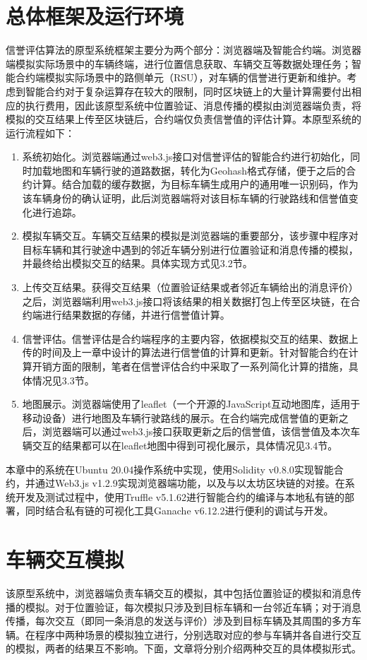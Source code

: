 \section{总体框架及运行环境}
信誉评估算法的原型系统框架主要分为两个部分：浏览器端及智能合约端。浏览器端模拟实际场景中的车辆终端，进行位置信息获取、车辆交互等数据处理任务；智能合约端模拟实际场景中的路侧单元（RSU），对车辆的信誉进行更新和维护。考虑到智能合约对于复杂运算存在较大的限制，同时区块链上的大量计算需要付出相应的执行费用，因此该原型系统中位置验证、消息传播的模拟由浏览器端负责，将模拟的交互结果上传至区块链后，合约端仅负责信誉值的评估计算。本原型系统的运行流程如下：
\begin{enumerate}
    \item 系统初始化。浏览器端通过web3.js接口对信誉评估的智能合约进行初始化，同时加载地图和车辆行驶的道路数据，转化为Geohash格式存储，便于之后的合约计算。结合加载的缓存数据，为目标车辆生成用户的通用唯一识别码，作为该车辆身份的确认证明，此后浏览器端将对该目标车辆的行驶路线和信誉值变化进行追踪。
    \item 模拟车辆交互。车辆交互结果的模拟是浏览器端的重要部分，该步骤中程序对目标车辆和其行驶途中遇到的邻近车辆分别进行位置验证和消息传播的模拟，并最终给出模拟交互的结果。具体实现方式见3.2节。
    \item 上传交互结果。获得交互结果（位置验证结果或者邻近车辆给出的消息评价）之后，浏览器端利用web3.js接口将该结果的相关数据打包上传至区块链，在合约端进行结果数据的存储，并进行信誉值计算。
    \item 信誉评估。信誉评估是合约端程序的主要内容，依据模拟交互的结果、数据上传的时间及上一章中设计的算法进行信誉值的计算和更新。针对智能合约在计算开销方面的限制，笔者在信誉评估合约中采取了一系列简化计算的措施，具体情况见3.3节。
    \item 地图展示。浏览器端使用了leaflet（一个开源的JavaScript互动地图库，适用于移动设备）\cite{leaflet}进行地图及车辆行驶路线的展示。在合约端完成信誉值的更新之后，浏览器端可以通过web3.js接口获取更新之后的信誉值，该信誉值及本次车辆交互的结果都可以在leaflet地图中得到可视化展示，具体情况见3.4节。
\end{enumerate}

本章中的系统在Ubuntu 20.04操作系统中实现，使用Solidity v0.8.0实现智能合约，并通过Web3.js v1.2.9实现浏览器端功能，以及与以太坊区块链的对接。在系统开发及测试过程中，使用Truffle v5.1.62进行智能合约的编译与本地私有链的部署，同时结合私有链的可视化工具Ganache v6.12.2进行便利的调试与开发。

\section{车辆交互模拟}
该原型系统中，浏览器端负责车辆交互的模拟，其中包括位置验证的模拟和消息传播的模拟。对于位置验证，每次模拟只涉及到目标车辆和一台邻近车辆；对于消息传播，每次交互（即同一条消息的发送与评价）涉及到目标车辆及其周围的多方车辆。在程序中两种场景的模拟独立进行，分别选取对应的参与车辆并各自进行交互的模拟，两者的结果互不影响。下面，文章将分别介绍两种交互的具体模拟形式。
